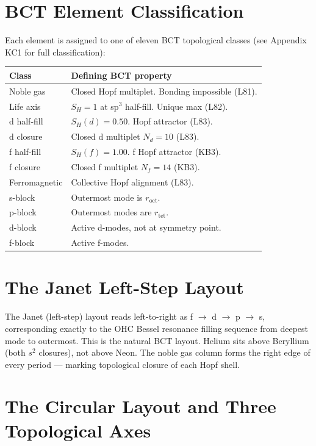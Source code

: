 \documentclass[aps,prl,twocolumn,superscriptaddress,floatfix]{revtex4-2}
\begin{document}
\section{BCT Element Classification}

Each element is assigned to one of eleven BCT topological classes
(see Appendix KC1 for full classification):

\begin{center}
\begin{tabular}{p{22mm}p{50mm}}
\toprule
Class & Defining BCT property \\
\midrule
Noble gas & Closed Hopf multiplet. Bonding impossible (L81). \\
Life axis & $S_H = 1$ at sp$^3$ half-fill. Unique max (L82). \\
d half-fill & $S_H(d) = 0.50$. Hopf attractor (L83). \\
d closure & Closed d multiplet $N_d = 10$ (L83). \\
f half-fill & $S_H(f) = 1.00$. f Hopf attractor (KB3). \\
f closure & Closed f multiplet $N_f = 14$ (KB3). \\
Ferromagnetic & Collective Hopf alignment (L83). \\
s-block & Outermost mode is $r_\mathrm{oct}$. \\
p-block & Outermost modes are $r_\mathrm{tet}$. \\
d-block & Active d-modes, not at symmetry point. \\
f-block & Active f-modes. \\
\bottomrule
\end{tabular}
\end{center}

\section{The Janet Left-Step Layout}

The Janet (left-step) layout reads left-to-right as
f $\to$ d $\to$ p $\to$ s, corresponding exactly to the OHC Bessel
resonance filling sequence from deepest mode to outermost.
This is the natural BCT layout. Helium sits above Beryllium
(both $s^2$ closures), not above Neon. The noble gas column
forms the right edge of every period --- marking topological
closure of each Hopf shell.

\section{The Circular Layout and Three Topological Axes}
\end{document}
